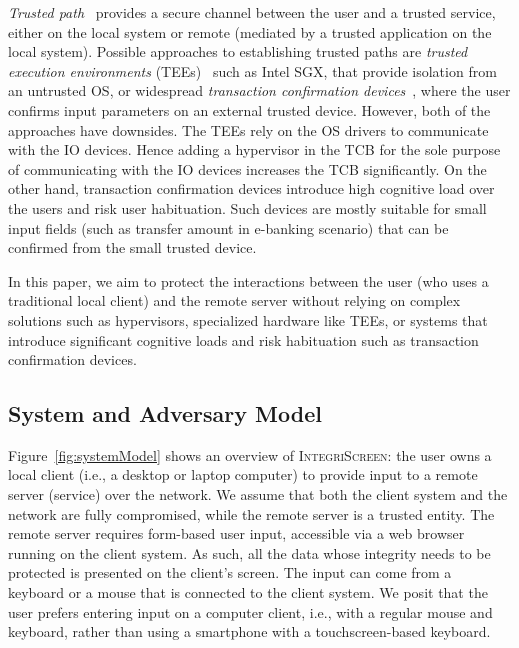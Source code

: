 \documentclass[sigconf, anonymous, balance=false]{acmart}
\newcommand{\sysname}{\textsc{IntegriScreen}\xspace}
\begin{document}
\emph{Trusted path}~\cite{x86} provides a secure channel between the user and a trusted service, either on the local system or remote (mediated by a trusted application on the local system).
Possible approaches to establishing trusted paths are \textit{trusted execution environments} (TEEs)~\cite{sgxio} such as Intel SGX, that provide isolation from an untrusted OS, or widespread \textit{transaction confirmation devices}~\cite{filyanov2011uni}, where the user confirms input parameters on an external trusted device.
However, both of the approaches have downsides. The TEEs rely on the OS drivers to communicate with the IO devices. Hence adding a hypervisor in the TCB for the sole purpose of communicating with the IO devices increases the TCB significantly. On the other hand, transaction confirmation devices introduce high cognitive load over the users and risk user habituation. Such devices are mostly suitable for small input fields (such as transfer amount in e-banking scenario) that can be confirmed from the small trusted device.

In this paper, we aim to protect the interactions between the user (who uses a traditional local client) and the remote server without relying on complex solutions such as hypervisors, specialized hardware like TEEs, or systems that introduce significant cognitive loads and risk habituation such as transaction confirmation devices.


\subsection{System and Adversary Model}
\label{sec:problemStatement:systemMode}


Figure~\ref{fig:systemModel} shows an overview of \sysname: the user owns a local client (i.e., a desktop or laptop computer) to provide input to a remote server (service) over the network. We assume that both the client system and the network are fully compromised, while the remote server is a trusted entity. The remote server requires form-based user input, accessible via a web browser running on the client system. As such, all the data whose integrity needs to be protected is presented on the client's screen.
The input can come from a keyboard or a mouse that is connected to the client system. We posit that the user prefers entering input on a computer client, i.e., with a regular mouse and keyboard, rather than using a smartphone with a touchscreen-based keyboard.
\end{document}
